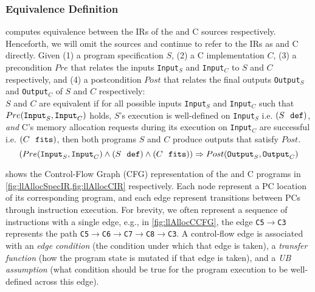 \subsubsection{Equivalence Definition}
\label{sec:syn-equivalence}
\toolName{} computes equivalence between the IRs of the \SpecL{} and C sources respectively.
Henceforth, we will omit the sources and continue to refer to the IRs as \SpecL{} and C directly.
Given (1) a \SpecL{} program specification $S$, (2) a C implementation $C$,
(3) a precondition $Pre$ that relates the inputs {\tt Input}$_S$ and {\tt Input}$_C$ to $S$ and $C$
respectively, and (4) a postcondition $Post$ that relates the final outputs {\tt Output}$_S$
and {\tt Output}$_C$ of $S$ and $C$ respectively:\\
$S$ and $C$ are equivalent if for all possible inputs {\tt Input}$_S$ and {\tt Input}$_C$ such that
$Pre(\mathrm{\tt Input}_S, \mathrm{\tt Input}_C)$ holds,
$S$'s execution is well-defined on {\tt Input}$_S$ i.e. $(S\ \ {\tt def})$, {\em and} C's
memory allocation requests during its execution on {\tt Input$_C$} are successful i.e. $(C\ \ {\tt fits})$,
then both programs $S$ and $C$ produce outputs
that satisfy $Post$.
$$
(Pre(\mathrm{\tt Input}_S, \mathrm{\tt Input}_C) \land (S\ \  \mathrm{\tt def}) \land (C\ \ \mathrm{\tt fits})) \Rightarrow Post(\mathrm{\tt Output}_S, \mathrm{\tt Output}_C)
$$



 shows the Control-Flow Graph (CFG) representation
of the \SpecL{} and C programs in \cref{fig:llAllocSpecIR,fig:llAllocCIR} respectively.
Each node represent a PC location of its corresponding program, and each edge represent
transitions between PCs through instruction execution. For brevity, we often represent
a sequence of instructions with a single edge, e.g., in \cref{fig:llAllocCCFG}, the edge
{\small \tt C5$\rightarrow$C3} represents the path
{\small \tt C5$\rightarrow$C6$\rightarrow$C7$\rightarrow$C8$\rightarrow$C3}.
A control-flow edge is associated with an {\em edge condition} (the condition under which that edge is taken),
a {\em transfer function} (how the program state is mutated if that edge is taken),
and a {\em UB assumption} (what condition should be true for the program
execution to be well-defined across this edge).



